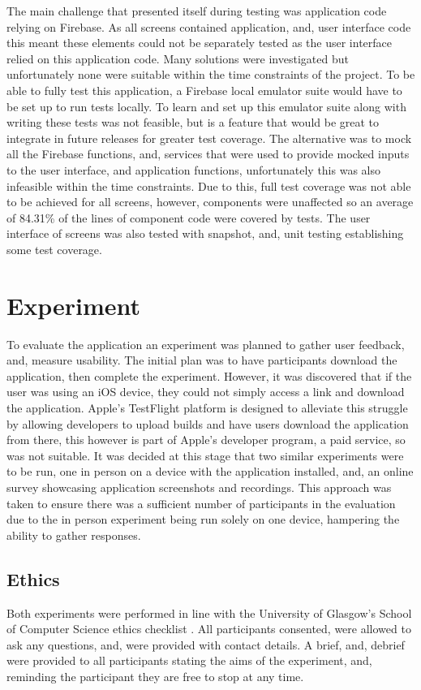The main challenge that presented itself during testing was application code relying on Firebase. As all screens contained application, and, user interface code this meant these elements could not be separately tested as the user interface relied on this application code. Many solutions were investigated but unfortunately none were suitable within the time constraints of the  project. To be able to fully test this application, a Firebase local emulator suite would have to be set up to run tests locally. To learn and set up this emulator suite along with writing these tests was not feasible, but is a feature that would be great to integrate in future releases for greater test coverage. The alternative was to mock all the Firebase functions, and, services that were used to provide mocked inputs to the  user interface, and application functions, unfortunately this was also infeasible within the time constraints. Due to this, full test coverage was not able to be achieved for all screens, however, components were unaffected so an average of 84.31\% of the lines of component code were covered by tests. The user interface of screens was also tested with snapshot, and, unit testing establishing some test coverage.   


\section{Experiment}
To evaluate the application an experiment was planned to gather user feedback, and, measure usability. The initial plan was to have participants download the application, then complete the experiment. However, it was discovered that if the user was using an iOS device, they could not simply access a link and download the application. Apple's TestFlight platform is designed to alleviate this struggle by allowing developers to upload builds and have users download the application from there, this however is part of Apple's developer program, a paid service, so was not suitable. It was decided at this stage that two similar experiments were to be run, one in person on a device with the application installed, and, an online survey showcasing application screenshots and recordings. This approach was taken to ensure there was a sufficient number of participants in the evaluation due to the in person experiment being run solely on one device, hampering the ability to gather responses. 

\subsection*{Ethics}
Both experiments were performed in line with the University of Glasgow's School of Computer Science ethics checklist \cite{ethics}. All participants consented, were allowed to ask any questions, and, were provided with contact details. A brief, and, debrief were provided to all participants stating the aims of the experiment, and, reminding the participant they are free to stop at any time.

